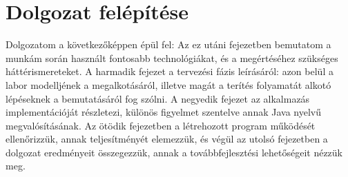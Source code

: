\section{Dolgozat felépítése}

Dolgozatom a következőképpen épül fel:
Az ez utáni fejezetben bemutatom a munkám során használt fontosabb technológiákat, és a megértéséhez szükséges háttérismereteket. A harmadik fejezet a tervezési fázis leírásáról: azon belül a labor modelljének a megalkotásáról, illetve magát a terítés folyamatát alkotó lépéseknek a bemutatásáról fog szólni. A negyedik fejezet az alkalmazás implementációját részletezi, különös figyelmet szentelve annak Java nyelvű megvalósításának. Az ötödik fejezetben a létrehozott program működését ellenőrizzük, annak teljesítményét elemezzük, és végül az utolsó fejezetben a dolgozat eredményeit összegezzük, annak a továbbfejlesztési lehetőségeit nézzük meg.
